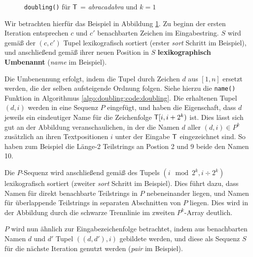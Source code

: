 \begin{figure}
\caption{\texttt{doubling()} für $\inputtext{}$ = \textit{abracadabra} und $k = 1$}
\label{algo:doubling:fig:doubling}
\end{figure}

Wir betrachten hierfür das Beispiel in Abbildung \ref{algo:doubling:fig:doubling}. Zu beginn der ersten Iteration entsprechen $c$ und $c'$ benachbarten Zeichen im Eingabestring. $S$ wird gemäß der $(c, c')$ Tupel lexikografisch sortiert (erster \textit{sort} Schritt im Beispiel), und anschließend gemäß ihrer neuen Position in $S$ \textbf{lexikographisch Umbenannt} (\textit{name} im Beispiel).

Die Umbenennung erfolgt, indem die Tupel durch Zeichen $d$ aus $[1, n]$ ersetzt werden, die der selben aufsteigende Ordnung folgen. Siehe hierzu die \texttt{name()} Funktion in Algorithmus \ref{algo:doubling:code:doubling}. Die erhaltenen Tupel $(d, i)$ werden in eine Sequenz $P$ eingefügt, und haben die Eigenschaft, dass $d$ jeweils ein eindeutiger Name für die Zeichenfolge $\inputtext{}[i, i + 2^k)$ ist. Dies lässt sich gut an der Abbildung veranschaulichen, in der die Namen $d$ aller $(d, i) \in P^k$ zusätzlich an ihren Textpositionen $i$ unter der Eingabe $\inputtext{}$ eingezeichnet sind. So haben zum Beispiel die Länge-2 Teilstrings an Postion 2 und 9 beide den Namen 10.

Die $P$-Sequenz wird anschließend gemäß des Tupels $(i \mod 2^k, i \div 2^k)$ lexikografisch sortiert (zweiter \textit{sort} Schritt im Beispiel). Dies führt dazu, dass Namen für direkt benachbarte Teilstrings in $P$ nebeneinander liegen, und Namen für überlappende Teilstrings in separaten Abschnitten von $P$ liegen. Dies wird in der Abbildung durch die schwarze Trennlinie im zweiten $P^k$-Array deutlich.

$P$ wird nun ähnlich zur Eingabezeichenfolge betrachtet, indem aus benachbarten Namen $d$ und $d'$ Tupel $((d, d'), i)$ gebildete werden, und diese als Sequenz $S$ für die nächste Iteration genutzt werden (\textit{pair} im Beispiel).

